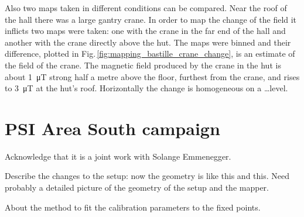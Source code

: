 Also two maps taken in different conditions can be compared. Near the roof of the hall there was a large gantry crane. In order to map the change of the field it inflicts two maps were taken: one with the crane in the far end of the hall and another with the crane directly above the hut. The maps were binned and their difference, plotted in Fig.\,\ref{fig:mapping_bastille_crane_change}, is an estimate of the field of the crane. The magnetic field produced by the crane in the hut is about \SI{1}{\micro\tesla} strong half a metre above the floor, furthest from the crane, and rises to \SI{3}{\micro\tesla} at the hut's roof. Horizontally the change is homogeneous on a \ldots level.






\section{PSI Area South campaign}

Acknowledge that it is a joint work with Solange Emmenegger.

Describe the changes to the setup: now the geometry is like this and this. Need probably a detailed picture of the geometry of the setup and the mapper.

About the method to fit the calibration parameters to the fixed points.